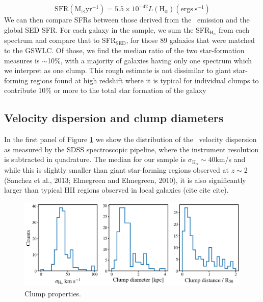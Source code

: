 \begin{equation}
\mathrm{SFR} (\mathrm{M}_{\odot} \mathrm{yr}^{-1}) = 5.5 \times 10^{-42}L(\mathrm{H}_{\alpha}) (\mathrm{ergs\ s}^{-1})
\end{equation}
 We can then compare SFRs between those derived from the \ha~emission and the global SED SFR. For each galaxy in the sample, we sum the SFR$_{\mathrm{H}_{\alpha}}$ from each spectrum and compare that to SFR$_{\mathrm{SED}}$, for those 89 galaxies that were matched to the GSWLC. Of those, we find the median ratio of the two star-formation measures is $\sim$10\%, with a majority of galaxies having only one spectrum which we interpret as one clump. This rough estimate is not dissimilar to giant star-forming regions found at high redshift where it is typical for individual clumps to contribute 10\% or more to the total star formation of the galaxy \citep{Genzel2011, Guo2012, Wisnioski2012}

\subsection{Velocity dispersion and clump diameters}

In the first panel of Figure \ref{fig: clump properties} we show the distribution of the \ha~velocity dispersion as measured by the SDSS spectroscopic pipeline, where the instrument resolution is subtracted in quadrature. The median for our sample is $\sigma_{\mathrm{H}_{\alpha}}\sim40$km/s and while this is slightly smaller than giant star-forming regions observed at $z\sim$2 (Sanchez et al., 2013; Elmegreen and Elmegreen, 2010), it is also significantly larger than typical HII regions observed in local galaxies (cite cite cite).



\begin{figure}
\includegraphics[width=\textwidth]{Figures/clump_properties.png}
\caption[Properties of ``clumps'': velocity dispersion, clump diameter, and clump galactic radial distance.]{Clump properties. }
\label{fig: clump properties}
\end{figure}


